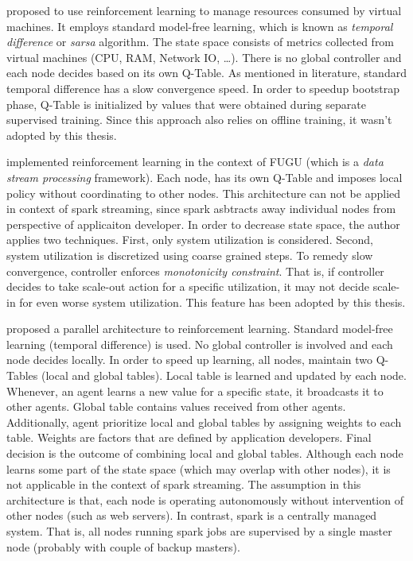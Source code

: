 \textcite{Rao:2009:VRL} proposed to use reinforcement learning to manage resources consumed by virtual machines. It employs standard model-free learning, which is known as \emph{temporal difference}\cite{rlIntro} or \emph{sarsa} algorithm. The state space consists of metrics collected from virtual machines (CPU, RAM, Network IO, \dots). There is no global controller and each node decides based on its own Q-Table. As mentioned in literature, standard temporal difference has a slow convergence speed. In order to speedup bootstrap phase, Q-Table is initialized by values that were obtained during separate supervised training. Since this approach also relies on offline training, it wasn't adopted by this thesis.\newline

\textcite{Heinze:2014} implemented reinforcement learning in the context of FUGU\cite{Grandl:2014:MPC} (which is a \emph{data stream processing} framework). Each node, has its own Q-Table and imposes local policy without coordinating to other nodes. This architecture can not be applied in context of spark streaming, since spark asbtracts away individual nodes from perspective of applicaiton developer. In order to decrease state space, the author applies two techniques. First, only system utilization is considered. Second, system utilization is discretized using coarse grained steps. To remedy slow convergence, controller enforces \emph{monotonicity constraint}\cite{Herodotou:2011}. That is, if controller decides to take scale-out action for a specific utilization, it may not decide scale-in for even worse system utilization. This feature has been adopted by this thesis.\newline

\textcite{Enda:2012} proposed a parallel architecture to reinforcement learning. Standard model-free learning (temporal difference) is used. No global controller is involved and each node decides locally. In order to speed up learning, all nodes, maintain two Q-Tables (local and global tables). Local table is learned and updated by each node. Whenever, an agent learns a new value for a specific state, it broadcasts it to other agents. Global table contains values received from other agents. Additionally, agent prioritize local and global tables by assigning weights to each table. Weights are factors that are defined by application developers. Final decision is the outcome of combining local and global tables. Although each node learns some part of the state space (which may overlap with other nodes), it is not applicable in the context of spark streaming. The assumption in this architecture is that, each node is operating autonomously without intervention of other nodes (such as web servers). In contrast, spark is a centrally managed system. That is, all nodes running spark jobs are supervised by a single master node (probably with couple of backup masters). \newline

